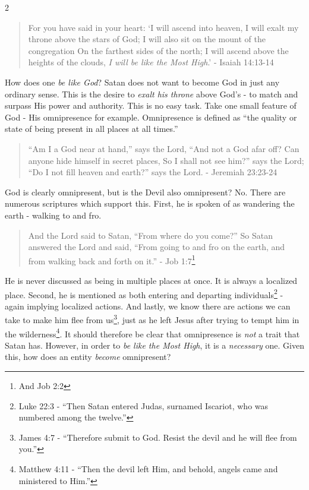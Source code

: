 \documentclass[10pt]{article}
\begin{document}
\begin{multicols}{2}
\begin{quotation}
For you have said in your heart:
`I will ascend into heaven,
I will exalt my throne above the stars of God;
I will also sit on the mount of the congregation
On the farthest sides of the north;
I will ascend above the heights of the clouds,
\textit{I will be like the Most High}.' - Isaiah 14:13-14
\end{quotation}

How does one \textit{be like God}? Satan does not want to become God in just any ordinary sense. This is the desire to \textit{exalt his throne} above God's - to match and surpass His power and authority. This is no easy task. Take one small feature of God - His omnipresence for example. Omnipresence is defined as ``the quality or state of being present in all places at all times.''

\begin{quotation}
``Am I a God near at hand,'' says the Lord,
``And not a God afar off?
Can anyone hide himself in secret places,
So I shall not see him?'' says the Lord;
``Do I not fill heaven and earth?'' says the Lord. - Jeremiah 23:23-24
\end{quotation}

God is clearly omnipresent, but is the Devil also omnipresent? No. There are numerous scriptures which support this. First, he is spoken of as wandering the earth - walking to and fro. 

\begin{quotation}
And the Lord said to Satan, ``From where do you come?'' So Satan answered the Lord and said, ``From going to and fro on the earth, and from walking back and forth on it.'' - Job 1:7\footnote{And Job 2:2}
\end{quotation}

He is never discussed as being in multiple places at once. It is always a localized place. Second, he is mentioned as both entering and departing individuals\footnote{Luke 22:3 - ``Then Satan entered Judas, surnamed Iscariot, who was numbered among the twelve.''} - again implying localized actions. And lastly, we know there are actions we can take to make him flee from us\footnote{James 4:7 - ``Therefore submit to God. Resist the devil and he will flee from you.''}, just as he left Jesus after trying to tempt him in the wilderness\footnote{Matthew 4:11 - ``Then the devil left Him, and behold, angels came and ministered to Him.''}. It should therefore be clear that omnipresence is \textit{not} a trait that Satan has. However, in order to \textit{be like the Most High}, it is a \textit{necessary} one. Given this, how does an entity \textit{become} omnipresent? 


\end{multicols}
\end{document}
